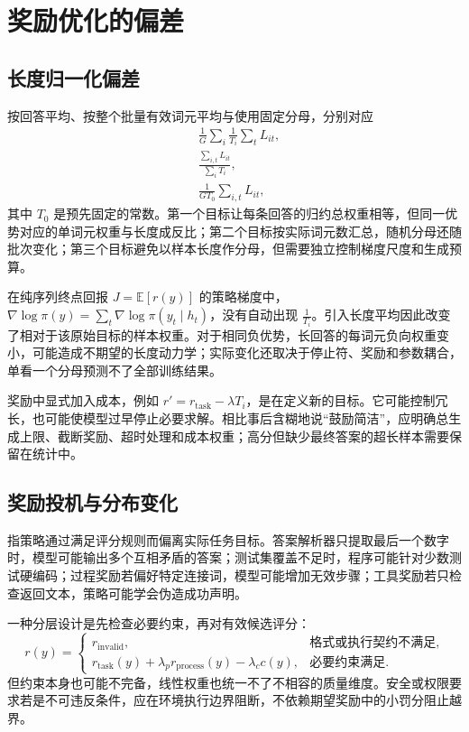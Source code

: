 \documentclass[../textbook.tex]{subfiles}
\begin{document}
\section{奖励优化的偏差}

\subsection{长度归一化偏差}
按回答平均、按整个批量有效词元平均与使用固定分母，分别对应
\begin{equation}
\begin{aligned}
 &\frac1G\sum_i\frac1{T_i}\sum_t L_{it}, \\
 &\frac{\sum_{i,t}L_{it}}{\sum_iT_i}, \\
 &\frac1{GT_0}\sum_{i,t}L_{it},
\end{aligned}
\end{equation}
其中 $T_0$ 是预先固定的常数。第一个目标让每条回答的归约总权重相等，但同一优势对应的单词元权重与长度成反比；第二个目标按实际词元数汇总，随机分母还随批次变化；第三个目标避免以样本长度作分母，但需要独立控制梯度尺度和生成预算。

在纯序列终点回报 $J=\mathbb E[r(y)]$ 的策略梯度中，$\nabla\log\pi(y)=\sum_t\nabla\log\pi(y_t\mid h_t)$，没有自动出现 $\frac{1}{T_i}$。引入长度平均因此改变了相对于该原始目标的样本权重。对于相同负优势，长回答的每词元负向权重变小，可能造成不期望的长度动力学；实际变化还取决于停止符、奖励和参数耦合，单看一个分母预测不了全部训练结果。

奖励中显式加入成本，例如 $r'=r_{\mathrm{task}}-\lambda T_i$，是在定义新的目标。它可能控制冗长，也可能使模型过早停止必要求解。相比事后含糊地说“鼓励简洁”，应明确总生成上限、截断奖励、超时处理和成本权重；高分但缺少最终答案的超长样本需要保留在统计中。

\subsection{奖励投机与分布变化}
指策略通过满足评分规则而偏离实际任务目标。答案解析器只提取最后一个数字时，模型可能输出多个互相矛盾的答案；测试集覆盖不足时，程序可能针对少数测试硬编码；过程奖励若偏好特定连接词，模型可能增加无效步骤；工具奖励若只检查返回文本，策略可能学会伪造成功声明。

一种分层设计是先检查必要约束，再对有效候选评分：
\begin{equation}
 r(y)=\begin{cases}
 r_{\mathrm{invalid}}, & \text{格式或执行契约不满足},\\
 r_{\mathrm{task}}(y)+\lambda_p r_{\mathrm{process}}(y)-\lambda_c c(y),
 & \text{必要约束满足}.
 \end{cases}
\end{equation}
但约束本身也可能不完备，线性权重也统一不了不相容的质量维度。安全或权限要求若是不可违反条件，应在环境执行边界阻断，不依赖期望奖励中的小罚分阻止越界。
\end{document}
